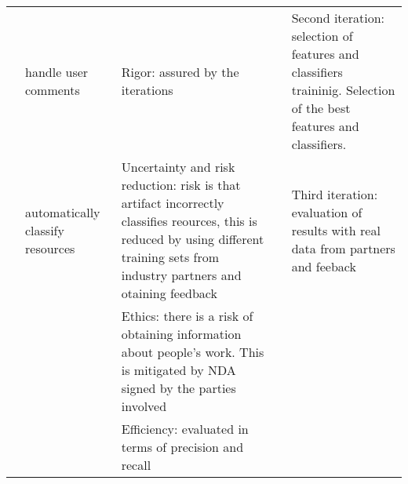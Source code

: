 \begin{longtable}[c]{@{}p{1cm}p{2.5cm}p{5cm}p{3cm}p{4cm}@{}}
                  & handle user comments                           & Rigor: assured by the iterations                                                                                                                                                                                                                                         &                                                                                                                                                      & Second iteration: selection of features and classifiers traininig. Selection of the best features and classifiers.            \\
                  & automatically classify resources               & Uncertainty and risk reduction: risk is that artifact incorrectly classifies reources, this is reduced by using different training sets from industry partners and otaining feedback                                                                                     &                                                                                                                                                      & Third iteration: evaluation of results with real data from partners and feeback                                               \\
                  &                                                & Ethics: there is a risk of obtaining information about people’s work. This is mitigated by NDA signed by the parties involved                                                                                                                                            &                                                                                                                                                      &                                                                                                                               \\
                  &                                                & Efficiency: evaluated in terms of precision and recall                                                                                                                                                                                                                   &                                                                                                                                                      &                                                                                                                               \\* \midrule

\end{longtable}
